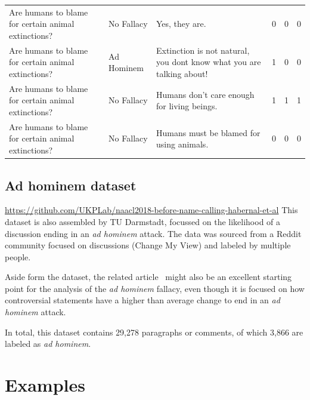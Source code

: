 \documentclass[a4paper]{article}
\begin{document}
\begin{table}
\begin{tabularx}{\textwidth}{@{}LlLlll@{}}
    Are humans to blame for certain animal extinctions? & No Fallacy                    & Yes, they are.                                                                                                                           & 0    & 0      & 0      \\
    Are humans to blame for certain animal extinctions? & Ad Hominem                    & Extinction is not natural, you dont know what you are talking about!                                                                     & 1    & 0      & 0      \\
    Are humans to blame for certain animal extinctions? & No Fallacy                    & Humans don't care enough for living beings.                                                                                              & 1    & 1      & 1      \\
    Are humans to blame for certain animal extinctions? & No Fallacy                    & Humans must be blamed for using animals.                                                                                                 & 0    & 0      & 0      \\ \hline
    \end{tabularx}
\end{table}

\subsection{Ad hominem dataset~\cite{Habernal.et.al.2018.NAACL.adhominem}}
\url{https://github.com/UKPLab/naacl2018-before-name-calling-habernal-et-al}
This dataset is also assembled by TU Darmstadt, focussed on the likelihood of a discussion ending in an \emph{ad hominem} attack. The data was sourced from a Reddit community focused on discussions (Change My View) and labeled by multiple people.  

Aside form the dataset, the related article~\cite{Habernal.et.al.2018.NAACL.adhominem} might also be an excellent starting point for the analysis of the \emph{ad hominem} fallacy, even though it is focused on how controversial statements have a higher than average change to end in an \emph{ad hominem} attack.

In total, this dataset contains 29,278 paragraphs or comments, of which 3,866 are labeled as \emph{ad hominem}.


\section{Examples}
\end{document}
